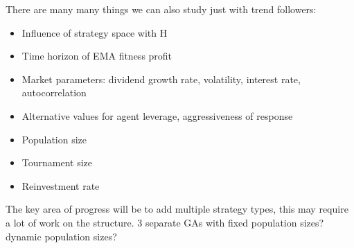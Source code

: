 \documentclass{article}
\begin{document}
There are many many things we can also study just with trend followers:
\begin{itemize}
    \item Influence of strategy space with H
    \item Time horizon of EMA fitness profit
    \item Market parameters: dividend growth rate, volatility, interest rate, autocorrelation
    \item Alternative values for agent leverage, aggressiveness of response 
    \item Population size
    \item Tournament size
    \item Reinvestment rate
\end{itemize}

The key area of progress will be to add multiple strategy types, this may require a lot of work on the structure. 3 separate GAs with fixed population sizes? dynamic population sizes?

\printbibliography
\end{document}
